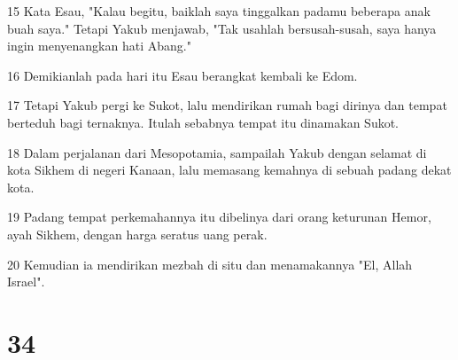 \par 15 Kata Esau, "Kalau begitu, baiklah saya tinggalkan padamu beberapa anak buah saya." Tetapi Yakub menjawab, "Tak usahlah bersusah-susah, saya hanya ingin menyenangkan hati Abang."
\par 16 Demikianlah pada hari itu Esau berangkat kembali ke Edom.
\par 17 Tetapi Yakub pergi ke Sukot, lalu mendirikan rumah bagi dirinya dan tempat berteduh bagi ternaknya. Itulah sebabnya tempat itu dinamakan Sukot.
\par 18 Dalam perjalanan dari Mesopotamia, sampailah Yakub dengan selamat di kota Sikhem di negeri Kanaan, lalu memasang kemahnya di sebuah padang dekat kota.
\par 19 Padang tempat perkemahannya itu dibelinya dari orang keturunan Hemor, ayah Sikhem, dengan harga seratus uang perak.
\par 20 Kemudian ia mendirikan mezbah di situ dan menamakannya "El, Allah Israel".

\chapter{34}

